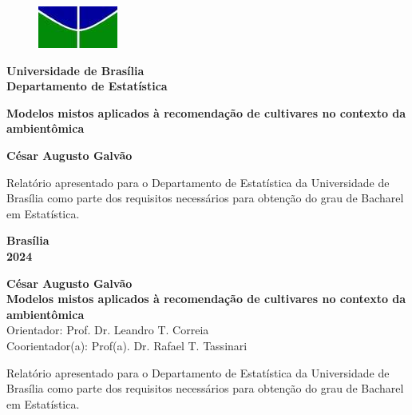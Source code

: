 \documentclass[12pt, a4paper, twoside]{report}
\numberwithin{equation}{subsection} %
\newcommand{\titulo}{Modelos mistos aplicados à recomendação de cultivares no contexto da ambientômica}
\newcommand{\autor}{César Augusto Galvão}
\newcommand{\orientador}{ Prof. Dr. Leandro T. Correia}
\newcommand{\coorientador}{ Prof(a). Dr. Rafael T. Tassinari}
\begin{document}
\begin{titlepage}
\begin{center}
\begin{figure}[h!]
	\centering
		\includegraphics[scale = 0.8]{unb.png}
	\label{fig:unb}
\end{figure}
{\bf Universidade de Brasília \\
\bf Departamento de Estatística}
\vspace{5cm}

\setcounter{page}{0}
\null
\textbf{\titulo}
\vspace{2.5cm}


\vspace{0.2cm}
\textbf{\autor}
\end{center}
\vspace{1.5cm}

\begin{flushright}
\begin{minipage}{7.5cm}
\parbox[t]{7.5cm}{Relatório apresentado para o Departamento de Estatística da Universidade de Brasília como parte dos requisitos necessários para obtenção do grau de Bacharel em Estatística.}
\end{minipage}
\end{flushright}

\vspace{5cm}

\begin{center}
{\bf{Brasília} \\ }
\bf{2024}
\end{center}

\end{titlepage}

\thispagestyle{empty}

\begin{center}
\textbf{\autor} \\
\vspace{5cm}
\textbf{\titulo} \\
\vspace{3cm}
\small
Orientador: \orientador \\
Coorientador(a): \coorientador
\end{center}


\vspace*{3cm}

\begin{flushright}
\begin{minipage}{7.5cm}
 \parbox[t]{7.5cm}{Relatório apresentado para o Departamento de Estatística da Universidade de Brasília como parte dos requisitos necessários para obtenção do grau de Bacharel em Estatística.}
\end{minipage}
\end{flushright}
\end{document}
